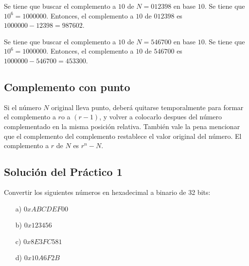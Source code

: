 \begin{ejemplo}
    Se tiene que buscar el complemento a $10$ de $N=012398$ en base $10$. Se tiene que $10^6 = 1000000$. Entonces, el complemento a $10$ de $012398$ es $1000000 - 12398 = 987602$.
\end{ejemplo}

\begin{ejemplo}
    Se tiene que buscar el complemento a $10$ de $N=546700$ en base $10$. Se tiene que $10^6 = 1000000$. Entonces, el complemento a $10$ de $546700$ es $1000000 - 546700 = 453300$.
\end{ejemplo}

\subsection{Complemento con punto}
Si el número $N$ original lleva punto, deberá quitarse temporalmente para formar el complemento a $r$o a $(r-1)$, y volver a colocarlo despues del número complementado en la misma posición relativa. También vale la pena mencionar que el complemento del complemento restablece el valor original del número. El complemento a $r$ de $N$ es $r^n-N$.

\subsection{Solución del Práctico 1}
\begin{ejer}
    Convertir los siguientes números en hexadecimal a binario de 32 bits:
    \begin{itemize}
        \item[a)] $0xABCDEF00$
        \item[b)] $0x123456$
        \item[c)] $0x8E3FC581$
        \item[d)] $0x10A6F2B$
    \end{itemize}
\end{ejer}

